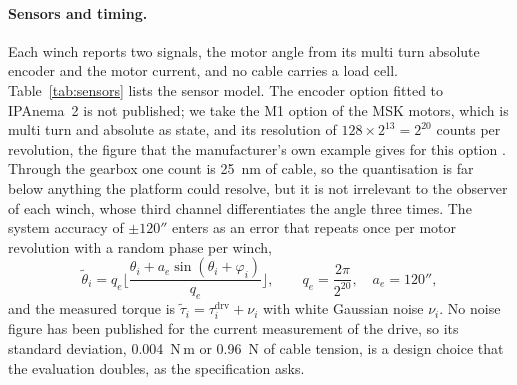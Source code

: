 \documentclass[10pt]{article}
\begin{document}
\paragraph{Sensors and timing.} Each winch reports two signals, the motor angle from its multi turn absolute encoder and the motor current, and no cable carries a load cell. Table~\ref{tab:sensors} lists the sensor model. The encoder option fitted to IPAnema~2 is not published; we take the M1 option of the MSK motors, which is multi turn and absolute as \citet{pott2013ipanema} state, and its resolution of $128\times2^{13}=2^{20}$ counts per revolution, the figure that the manufacturer's own example gives for this option \citep{rexroth_msk2018}. Through the gearbox one count is 25~nm of cable, so the quantisation is far below anything the platform could resolve, but it is not irrelevant to the observer of each winch, whose third channel differentiates the angle three times. The system accuracy of $\pm120''$ enters as an error that repeats once per motor revolution with a random phase per winch,
\begin{equation}\label{eq:encoder}
\tilde\theta_i=q_e\Big\lfloor\frac{\theta_i+a_e\sin(\theta_i+\varphi_i)}{q_e}\Big\rfloor,\qquad q_e=\frac{2\pi}{2^{20}},\quad a_e=120'' ,
\end{equation}
and the measured torque is $\tilde\tau_i=\tau_i^{\mathrm{drv}}+\nu_i$ with white Gaussian noise $\nu_i$. No noise figure has been published for the current measurement of the drive, so its standard deviation, 0.004~N\,m or 0.96~N of cable tension, is a design choice that the evaluation doubles, as the specification asks.
\end{document}
